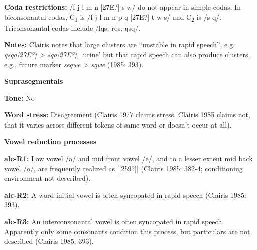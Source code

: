 \begin{styleBody}
\textbf{Coda restrictions:} /f j l m n [27E?] s w/ do not appear in simple codas. In biconsonantal codas, C\textsubscript{1} is /f j l m n p q [27E?] t w s/ and C\textsubscript{2} is /s q/. Triconsonantal codas include /lqs, rqs, qsq/.
\end{styleBody}

\begin{styleBody}
\textbf{Notes: }Clairis notes that large clusters are “unstable in rapid speech”, e.g. \textit{qsqa[27E?] {\textgreater} sqa[27E?]}, ‘urine’ but that rapid speech can also produce clusters, e.g., future marker \textit{seqwe {\textgreater} sqwe} (1985: 393).
\end{styleBody}

\begin{styleBody}
\textbf{Suprasegmentals}
\end{styleBody}

\begin{styleBody}
\textbf{Tone: }No
\end{styleBody}

\begin{styleBody}
\textbf{Word stress: }Disagreement (Clairis 1977 claims stress, Clairis 1985 claims not, that it varies across different tokens of same word or doesn’t occur at all).
\end{styleBody}

\begin{styleBody}
\textbf{Vowel reduction processes}
\end{styleBody}

\begin{styleBody}
\textbf{alc-R1: }Low vowel /a/ and mid front vowel /e/, and to a lesser extent mid back vowel /o/, are frequently realized as [[259?]] (Clairis 1985: 382-4; conditioning environment not described).
\end{styleBody}

\begin{styleBody}
\textbf{alc-R2:} A word-initial vowel is often syncopated in rapid speech (Clairis 1985: 393).
\end{styleBody}

\begin{styleBody}
\textbf{alc-R3:} An interconsonantal vowel is often syncopated in rapid speech. Apparently only some consonants condition this process, but particulars are not described (Clairis 1985: 393).
\end{styleBody}

